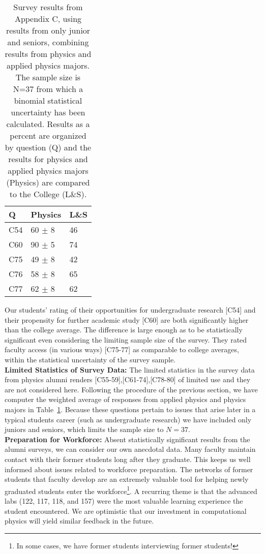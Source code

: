 \documentclass[12pt]{article}
\begin{document}
\begin{table}[htbp]
\caption{\label{tbl:appcii} Survey results from Appendix C, using results from only junior and seniors, combining results from physics and applied physics majors. The sample size is N=37
from which a binomial statistical uncertainty has been calculated.  Results as a percent are 
organized by question (Q) and the results for physics and applied physics majors (Physics) are 
compared to the College (L\&S).}
\begin{center}
\begin{tabular}{|lll|}
\hline
Q & Physics & L\&S \\
\hline
C54 & 60 $\pm$ 8 & 46 \\ 
C60 & 90 $\pm$ 5 & 74 \\
C75 & 49 $\pm$ 8 & 42 \\ 
C76 & 58 $\pm$ 8 & 65 \\ 
C77 & 62 $\pm$ 8 & 62 \\ 
\hline 
\end{tabular}
\end{center}
\end{table}

\noindent
Our students' rating of their opportunities for undergraduate research [C54] and their propensity for further academic study [C60] are both significantly higher than the college average.  The difference is large enough as to be statistically significant even considering the limiting sample size of the survey.
They rated faculty access (in various ways) [C75-77] as comparable to college averages, within the statistical uncertainty of the survey sample.\\[3pt]

\noindent
{\bf Limited Statistics of Survey Data:}  The limited statistics in the survey data from physics alumni renders [C55-59],[C61-74],[C78-80] of limited use and they are not considered here.  Following the procedure of the previous section, we have computer the weighted average of responses from applied physics and physics majors in Table~\ref{tbl:appcii}.  Because these questions pertain to issues that arise later in a typical students career (such as undergraduate research) we have included only juniors and seniors, which limits the sample size to $N=37$.\\[3pt]

\noindent
{\bf Preparation for Workforce:}  Absent statistically significant results from the alumni surveys, we can consider our own anecdotal data.  Many faculty maintain contact with their former students long after they graduate.  This keeps us well informed about issues related to workforce preparation.  The networks of former students that faculty develop are an extremely valuable tool for helping newly graduated students enter the workforce\footnote{In some cases, we have former students interviewing former students!}.  A recurring theme is that the advanced labs (122, 117, 118, and 157) were the most valuable learning experience the student encountered.  We are optimistic that our investment in computational physics will yield similar feedback in the future.
\end{document}

